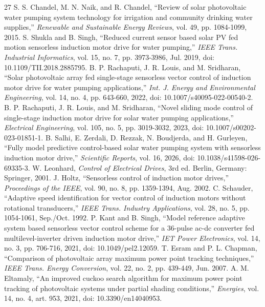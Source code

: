 \documentclass[journal]{IEEEtran}
\begin{document}
\begin{thebibliography}{27}
 S. S. Chandel, M. N. Naik, and R. Chandel, ``Review of solar photovoltaic water pumping system technology for irrigation and community drinking water supplies,'' \emph{Renewable and Sustainable Energy Reviews}, vol. 49, pp. 1084-1099, 2015.
 S. Shukla and B. Singh, ``Reduced current sensor based solar PV fed motion sensorless induction motor drive for water pumping,'' \emph{IEEE Trans. Industrial Informatics}, vol. 15, no. 7, pp. 3973-3986, Jul. 2019, doi: 10.1109/TII.2018.2885795.
 B. P. Rachaputi, J. R. Louis, and M. Sridharan, ``Solar photovoltaic array fed single-stage sensorless vector control of induction motor drive for water pumping applications,'' \emph{Int. J. Energy and Environmental Engineering}, vol. 14, no. 4, pp. 643-660, 2022, doi: 10.1007/s40095-022-00540-2.
 B. P. Rachaputi, J. R. Louis, and M. Sridharan, ``Novel sliding mode control of single-stage induction motor drive for solar water pumping applications,'' \emph{Electrical Engineering}, vol. 105, no. 5, pp. 3019-3032, 2023, doi: 10.1007/s00202-023-01851-1.
 B. Salhi, E. Zerdali, D. Rezzak, N. Boudjerda, and H. Gurleyen, ``Fully model predictive control-based solar water pumping system with sensorless induction motor drive,'' \emph{Scientific Reports}, vol. 16, 2026, doi: 10.1038/s41598-026-69335-3.
 W. Leonhard, \emph{Control of Electrical Drives}, 3rd ed. Berlin, Germany: Springer, 2001.
 J. Holtz, ``Sensorless control of induction motor drives,'' \emph{Proceedings of the IEEE}, vol. 90, no. 8, pp. 1359-1394, Aug. 2002.
 C. Schauder, ``Adaptive speed identification for vector control of induction motors without rotational transducers,'' \emph{IEEE Trans. Industry Applications}, vol. 28, no. 5, pp. 1054-1061, Sep./Oct. 1992.
 P. Kant and B. Singh, ``Model reference adaptive system based sensorless vector control scheme for a 36-pulse ac-dc converter fed multilevel-inverter driven induction motor drive,'' \emph{IET Power Electronics}, vol. 14, no. 3, pp. 706-716, 2021, doi: 10.1049/pel2.12059.
 T. Esram and P. L. Chapman, ``Comparison of photovoltaic array maximum power point tracking techniques,'' \emph{IEEE Trans. Energy Conversion}, vol. 22, no. 2, pp. 439-449, Jun. 2007.
 A. M. Eltamaly, ``An improved cuckoo search algorithm for maximum power point tracking of photovoltaic systems under partial shading conditions,'' \emph{Energies}, vol. 14, no. 4, art. 953, 2021, doi: 10.3390/en14040953.

\end{thebibliography}
\end{document}
